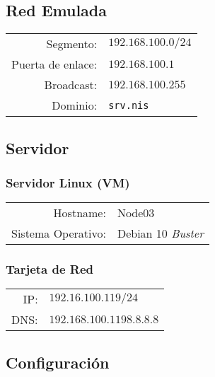 \documentclass[../main.tex]{subfiles}
\begin{document}
\subsection{Red Emulada}\label{sec:red_emu}

\begin{table}[H]
  \centering
  \begin{tabular}{rl}
    
    Segmento:&$192.168.100.0/24$\\
    Puerta de enlace:&$192.168.100.1$\\
    Broadcast:&$192.168.100.255$\\
    Dominio:&\texttt{srv.nis}\\
  \end{tabular}
\end{table}

\subsection{Servidor}\label{sec:servidor}

\subsubsection{Servidor Linux (VM)}\label{sec:slvm}


\begin{table}[H]
  \centering
  \begin{tabular}{rl}
    
    Hostname: &Node03\\
    Sistema Operativo: & Debian 10 \textit{Buster}\\
  \end{tabular}
\end{table}

\subsubsection{Tarjeta de Red}\label{sec:tr}

\begin{table}[H]
  \centering
  \begin{tabular}{rl}
    
    IP:&$192.16.100.119/24$\\
    DNS:&$192.168.100.119 8.8.8.8$\\
  \end{tabular}
\end{table}

\subsection{Configuración}\label{sec:serv_conf}
\end{document}
